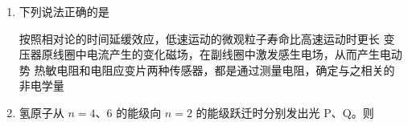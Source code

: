 \documentclass[\gkver]{gaokaozhenti}
\begin{document}
\begin{enumerate}
{则中点处感应电动势最大值为 $E_{\text{max}} = BLv_{m} = \frac{3}{2}\pi \times 10^{-5}\UV$，故 B 错误；

C．金属丝在中点附近的匀强磁场中振动，产生的是正弦式交流电，电动势的有效值为 $E = \frac{E_{\text{max}}}{\sqrt{2}}$，若用最大感应电动势 $E_{\text{max}} = \frac{3}{2}\pi \times 10^{-5}\UV$ 接外电阻，则金属丝本身内阻 $r = 0.5\UO$，正弦交流源在内阻 $r$ 和外阻 $R$ 串联时，当 $R = r = 0.5\UO$ 时可得最大输出功率为 $P_{\text{max}} = \frac{(\frac{E_{\text{max}}}{\sqrt{2}})^{2}}{4r} = \frac{9}{16}\pi^{2} \times 10^{-10}\UW$，故 C 正确；

D．若改为沿金属丝方向振动形成纵波，两端固定则端点处必为纵波的振动节（位移为零处），其基频振型中点恰为振幅最大处（波腹），并非振幅为零，故 D 错误。

故选 C。
}

\item
下列说法正确的是

{按照相对论的时间延缓效应，低速运动的微观粒子寿命比高速运动时更长}
{变压器原线圈中电流产生的变化磁场，在副线圈中激发感生电场，从而产生电动势}
{热敏电阻和电阻应变片两种传感器，都是通过测量电阻，确定与之相关的非电学量}


\item
氢原子从 $n = 4$、6 的能级向 $n = 2$ 的能级跃迁时分别发出光 P、Q。则


\end{enumerate}
\end{document}
